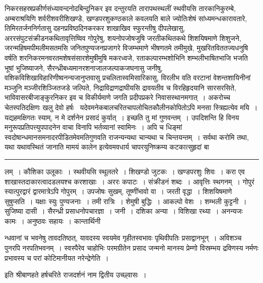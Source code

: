 \documentclass[11pt, openany]{book}
\begin{document}
\noindent
निकरसहस्रप्रकीर्णसंध्यावन्दनोदबिन्दुनिकर इव दन्तुरयति तारापथस्थलीं स्थवीयसि तारकानिकुरम्बे, अम्बराश्रयिणि शर्वरीशवरीशिखण्डे, खण्डपरशुकण्ठकाले कवलयति बाले ज्योतिःशेषं सांध्यमन्धकारावतारे, तिमिरतर्जननिर्गतासु दहनप्रविष्ठदिनकरकर शाखाखिव स्फुरन्तीषु दीपलेखासु, अररसंपुटसंक्रीडनकथितावृत्तिष्विव गोपुरेषु, शयनोपजोषजुषि जरतीकथितकथे शिशयिषमाणे शिशुजने, जरन्महिषमपीमलीमसतमसि जनितपुण्यजनप्रजागरे विजम्भमाणे भीषणतमे तमीमुखे, मुखरितविततज्यधनुषि वर्षति शरनिकरमनवरतमशेषसंसारशेमुषीमुषि मकरध्वजे, रताकल्पारम्भशोभिनि शम्भलीभाषितभाजि भजति भूषां भुजिष्याजने, सैरन्ध्रीबध्यमानरशनाजालजल्पाकजघनासु जनीषु, वशिकविशिखाविहारिणीष्वनन्यजानुप्तवासु प्रचलितास्वमिसारिकासु, विरलीभ वति वरटानां वेशन्तशायिनीनां मञ्जुनि मञ्जीरशिञ्जितजडे जल्पिते, निद्राविद्राणद्राघीयसि द्रावयतीव च विरहिहृदयानि सारसरसिते, भाविवासरबीजाङ्कुरनिकर इव च विकीर्यमाणे जगति प्रदीपप्रकरे निवासस्थानमगात्~। अकरोच्च चेतस्पतिदक्षिणः खलु देवो हर्षः \textendash\ यदेवमनेकबालचरितचापलोचितकौलीनकोपितोऽपि मनसा स्त्रिह्यत्येव मयि~। यद्यहमक्षिगतः स्याम्, न मे दर्शनेन प्रसादं कुर्यात्~। इच्छति तु मां गुणवन्तम्~। उपदिशन्ति हि विनय मनुरूपप्रतिपत्त्युपपादनेन वाचा विनापि भर्तव्यानां स्वामिनः~। अपि च धिङ्मां स्वदोषान्धमानसमनादरपीडितमेवमतिगुणवति राजन्यन्यथा चान्यथा च चिन्तयन्तम्~। सर्वथा करोमि तथा, यथा यथावस्थितं जानाति मामयं कालेन इत्येवमवधार्य चापरयुनिष्क्रम्य कटकात्सुहृदां बा\textendash

\vspace{2mm}
\hrule

\noindent
{\s लम्~। कौशिका उलूकाः~। स्थवीयसि स्थूलतरे~। शिखण्डो जुटकः~। खण्डपरशुः शिवः~। करा एव शाखास्तदाकारत्वादडलयश्च करशाखाः~। अररः कपाटः~। संक्रीडनं शब्दः~। आवृत्तिः स्थगनम्~। {\qt गोपुरं स्यात्पुरद्वारं द्वारमात्रेऽपि गोपुरम्}~। उपजोषः सुखम्, तूष्णींभावो वा~। जरती वृद्धा~। शिशयिषमाणे सुषुप्सति~। यक्षाः स्युः पुण्यजनाः~। तमी रात्रिः~। शेमुषी बुद्धिः~। आकल्पो वेशः~। शम्भली कुट्टनी~। सुजिष्या दासी~। सैरन्ध्री प्रसाधनोपचारज्ञा~। जनी~। दशिका अन्या~। विशिखा रथ्या~। अनन्यजः कामः~। अनुष्ठवः सहायः~। कान्तार्थिनी}


\newpage
\lfoot{}

\noindent
न्धवानां च भवनेषु तावदतिष्ठत्, यावदस्य स्वयमेव गृहीतस्वभावः पृथिवीपतिः प्रसाद्वानभून्~। अविशञ्च पुनरपि नरपतिभवनम्~। स्वस्पैरेव चाहोभिः परमग्रीतेन प्रसाद जन्मनो मानस्य प्रेम्णो विस्रम्भय द्रविणस्य नर्मणः प्रभावस्य च परां कोटिमानीयत नरेन्द्रेणेति~।

\begin{center}
{\s इति श्रीबाणहते हर्षचरिते राजदर्शनं नाम द्वितीय उच्छ्वासः~।}
\end{center}
\end{document}
